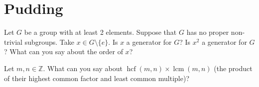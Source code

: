 \documentclass[answers]{exam}
\begin{document}
\section*{Pudding}
\begin{questions}

\question%
Let $G$ be a group with at least 2 elements. Suppose that $G$ has no proper non-trivial subgroups. Take $x \in G \setminus\{e\}$. Is $x$ a generator for $G$? Is $x^{2}$ a generator for $G$? What can you say about the order of $x$?



\question%



\question%
Let $m, n \in \mathbb{Z}$. What can you say about $\operatorname{hcf}(m, n) \times \operatorname{lcm}(m, n)$ (the product of their highest common factor and least common multiple)?

\end{questions}
\end{document}
